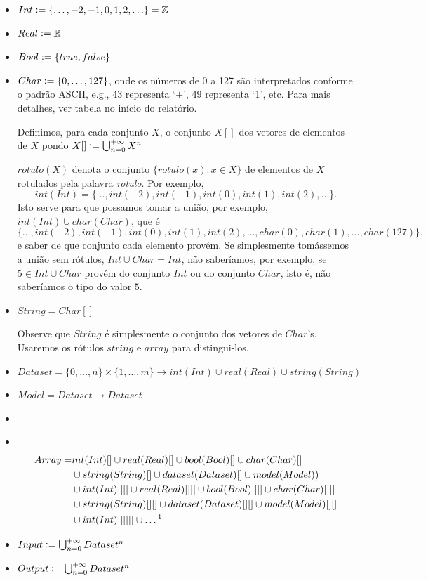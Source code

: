 \documentclass[12pt]{article}
\newcommand{\defeq}{\vcentcolon=}
\newcommand\Item[1][]{%
  \ifx\relax#1\relax  \item \else \item[#1] \fi
  \abovedisplayskip=0pt\abovedisplayshortskip=0pt~\vspace*{-\baselineskip}}
\begin{document}
\begin{itemize}
\item $Int \defeq \{\ldots, -2, -1, 0, 1, 2, \ldots\} = \mathbb{Z}$

\item $Real \defeq  \mathbb{R}$
\item $Bool \defeq \{true, false\}$
\item $Char \defeq \{0, \ldots, 127\}$, onde os números de 0 a 127 são interpretados conforme o padrão ASCII, e.g., 43 representa `$+$', 49 representa `1', etc. Para mais detalhes, ver tabela no início do relatório.

Definimos, para cada conjunto $X$, o conjunto $X[]$ dos vetores de elementos de $X$ pondo $X[] \defeq \bigcup_{n = 0}^{+\infty} X^n$

$rotulo(X)$ denota o conjunto $\{rotulo(x): x\in X\}$ de elementos de $X$ rotulados pela palavra {\it rotulo}. Por exemplo, $$int(Int) = \{\ldots, int(-2), int(-1), int(0), int(1), int(2), \ldots\}.$$ Isto serve para que possamos tomar a união, por exemplo, $int(Int) \cup char(Char)$, que é 
$$\{\ldots, int(-2), int(-1), int(0),  int(1), int(2), \ldots, char(0), char(1), \ldots, char(127)\},$$
e saber de que conjunto cada elemento provém. Se simplesmente tomássemos a união sem rótulos, $Int \cup Char = Int$, não saberíamos, por exemplo, se $5\in Int \cup Char$ provém do conjunto $Int$ ou do conjunto $Char$, isto é, não saberíamos o tipo do valor $5$.

\item $String = Char[]$

Observe que $String$ é simplesmente o conjunto dos vetores de $Char$'s. Usaremos os rótulos $string$ e $array$ para distingui-los.

\item $Dataset = \{0, \ldots, n\} \times \{1, \ldots, m\} \rightarrow int(Int) \cup real(Real) \cup string(String)$

\item $Model = Dataset \rightarrow Dataset$

\Item \begin{align*} 
Array = & int(Int)[] \cup real(Real)[] \cup bool(Bool)[]\cup char(Char)[] \\ 
&\cup string(String)[] \cup dataset(Dataset)[] \cup model(Model)) \\
&\cup int(Int)[][] \cup real(Real)[][] \cup bool(Bool)[][]\cup char(Char)[][] \\
&\cup string(String)[][] \cup dataset(Dataset)[][] \cup model(Model)[][] \\
&\cup int(Int)[][][] \cup \ldots\text{\footnotemark}
\end{align*}
\item $Input \defeq \bigcup_{n = 0}^{+\infty} Dataset^n$
\item $Output \defeq \bigcup_{n = 0}^{+\infty} Dataset^n$


\end{itemize}
\end{document}
